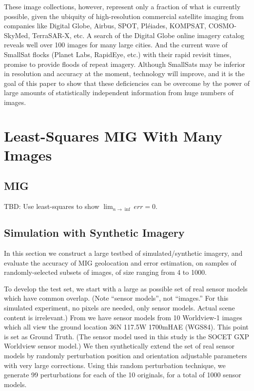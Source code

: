 \documentclass[11pt]{amsart}
\begin{document}
These image collections, however, represent only a fraction of what is currently
possible, given the ubiquity of high-resolution commercial satellite imaging
from companies like Digital Globe, Airbus, SPOT, Pl\'eiades, KOMPSAT,
COSMO-SkyMed, TerraSAR-X, etc. A search of the Digital Globe online imagery
catalog \cite{BROWSE_DG} reveals well over 100 images for many large cities. And
the current wave of SmallSat flocks (Planet Labs, RapidEye, etc.) with their
rapid revisit times, promise to provide floods of repeat imagery. Although
SmallSats may be inferior in resolution and accuracy at the moment, technology
will improve, and it is the goal of this paper to show that these deficiencies
can be overcome by the power of large amounts of statistically independent
information from huge numbers of images.

\section{Least-Squares MIG With Many Images}
\subsection{MIG}\label{MIG}
TBD: Use least-squares to show $\lim_{n\rightarrow\inf}err=0$.

\subsection{Simulation with Synthetic Imagery}
In this section we construct a large testbed of simulated/synthetic imagery, and
evaluate the accuracy of MIG geolocation and error estimation, on samples of
randomly-selected subsets of images, of size ranging from 4 to 1000.

To develop the test set, we start with a large as possible set of real sensor
models which have common overlap. (Note ``sensor models'', not ``images.'' For
this simulated experiment, no pixels are needed, only sensor models. Actual
scene content is irrelevant.)  From \cite{MIN} we have sensor models from 10
Worldview-1 images which all view the ground location 36N 117.5W 1700mHAE
(WGS84). This point is set as Ground Truth. (The sensor model used in this study
is the SOCET GXP \cite{SGXP} Worldview sensor model.) We then synthetically
extend the set of real sensor models by randomly perturbation position and
orientation adjustable parameters with very large corrections. Using this random
perturbation technique, we generate 99 perturbations for each of the 10
originals, for a total of 1000 sensor models.
\end{document}
